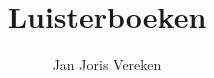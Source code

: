 \documentclass[dutch,twocolumn]{article}
\title{Luisterboeken}
\author{Jan Joris Vere\ij{}ken}
\begin{document}
   \maketitle
   \nocite{*}
   
   \renewcommand{\refname}{\vskip-2.65ex}
   \footnotesize
   
\end{document}
